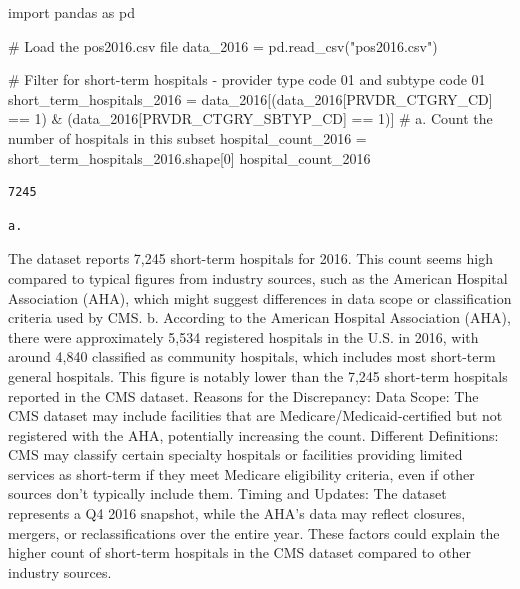 \documentclass[
  letterpaper,
  DIV=11,
  numbers=noendperiod]{scrartcl}
\newenvironment{Shaded}{\begin{snugshade}}{\end{snugshade}}
\newcommand{\CommentTok}[1]{\textcolor[rgb]{0.37,0.37,0.37}{#1}}
\newcommand{\DecValTok}[1]{\textcolor[rgb]{0.68,0.00,0.00}{#1}}
\newcommand{\ImportTok}[1]{\textcolor[rgb]{0.00,0.46,0.62}{#1}}
\newcommand{\NormalTok}[1]{\textcolor[rgb]{0.00,0.23,0.31}{#1}}
\newcommand{\OperatorTok}[1]{\textcolor[rgb]{0.37,0.37,0.37}{#1}}
\newcommand{\StringTok}[1]{\textcolor[rgb]{0.13,0.47,0.30}{#1}}
\begin{document}
\begin{Shaded}
\begin{Highlighting}[]
\ImportTok{import}\NormalTok{ pandas }\ImportTok{as}\NormalTok{ pd}

\CommentTok{\# Load the pos2016.csv file}
\NormalTok{data\_2016 }\OperatorTok{=}\NormalTok{ pd.read\_csv(}\StringTok{"pos2016.csv"}\NormalTok{)}

\CommentTok{\# Filter for short{-}term hospitals {-} provider type code 01 and subtype code 01}
\NormalTok{short\_term\_hospitals\_2016 }\OperatorTok{=}\NormalTok{ data\_2016[(data\_2016[}\StringTok{\textquotesingle{}PRVDR\_CTGRY\_CD\textquotesingle{}}\NormalTok{] }\OperatorTok{==} \DecValTok{1}\NormalTok{) }\OperatorTok{\&}\NormalTok{ (data\_2016[}\StringTok{\textquotesingle{}PRVDR\_CTGRY\_SBTYP\_CD\textquotesingle{}}\NormalTok{] }\OperatorTok{==} \DecValTok{1}\NormalTok{)]}
\CommentTok{\# a. Count the number of hospitals in this subset}
\NormalTok{hospital\_count\_2016 }\OperatorTok{=}\NormalTok{ short\_term\_hospitals\_2016.shape[}\DecValTok{0}\NormalTok{]}
\NormalTok{hospital\_count\_2016}
\end{Highlighting}
\end{Shaded}

\begin{verbatim}
7245
\end{verbatim}

\begin{verbatim}
a.
\end{verbatim}

The dataset reports 7,245 short-term hospitals for 2016. This count
seems high compared to typical figures from industry sources, such as
the American Hospital Association (AHA), which might suggest differences
in data scope or classification criteria used by CMS. b. According to
the American Hospital Association (AHA), there were approximately 5,534
registered hospitals in the U.S. in 2016, with around 4,840 classified
as community hospitals, which includes most short-term general
hospitals. This figure is notably lower than the 7,245 short-term
hospitals reported in the CMS dataset. Reasons for the Discrepancy: Data
Scope: The CMS dataset may include facilities that are
Medicare/Medicaid-certified but not registered with the AHA, potentially
increasing the count. Different Definitions: CMS may classify certain
specialty hospitals or facilities providing limited services as
short-term if they meet Medicare eligibility criteria, even if other
sources don't typically include them. Timing and Updates: The dataset
represents a Q4 2016 snapshot, while the AHA's data may reflect
closures, mergers, or reclassifications over the entire year. These
factors could explain the higher count of short-term hospitals in the
CMS dataset compared to other industry sources.
\end{document}

